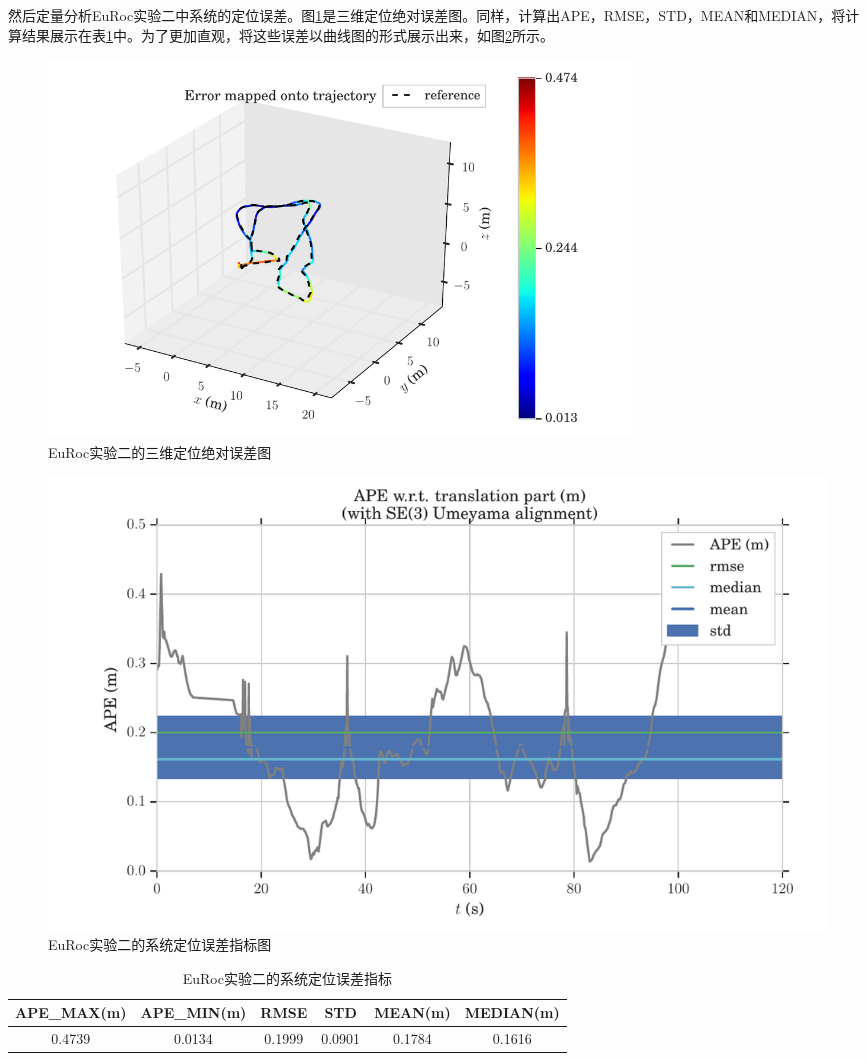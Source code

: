 然后定量分析EuRoc实验二中系统的定位误差。图\ref{fig5_11}是三维定位绝对误差图。同样，计算出APE，RMSE，STD，MEAN和MEDIAN，将计算结果展示在表\ref{tab:5.2}中。为了更加直观，将这些误差以曲线图的形式展示出来，如图\ref{fig5_12}所示。\newpage
\begin{figure}[!h]\setlength{\belowcaptionskip}{-12pt}
	\centering
	\includegraphics[width=0.75\textwidth]{figures/chapter5/ape_map_mh05}
	\caption{EuRoc实验二的三维定位绝对误差图}\label{fig5_11}
\end{figure}
\begin{figure}[!h]\setlength{\belowcaptionskip}{-12pt}
	\centering
	\includegraphics[width=1.0\textwidth]{figures/chapter5/ape_err_mh05}
	\caption{EuRoc实验二的系统定位误差指标图}\label{fig5_12}
\end{figure}
\begin{table}[!h]\setlength{\abovecaptionskip}{6pt}
	\centering
	\caption{EuRoc实验二的系统定位误差指标} \label{tab:5.2}
	\begin{tabular*}{0.9\textwidth}{@{\extracolsep{\fill}}cccccc}
		\toprule
		APE\_MAX(m)&APE\_MIN(m) &RMSE	&STD	&MEAN(m)	&MEDIAN(m) \\
		\midrule
		0.4739	&0.0134	&0.1999	&0.0901	&0.1784	&0.1616\\
		\bottomrule
	\end{tabular*}
\end{table}

